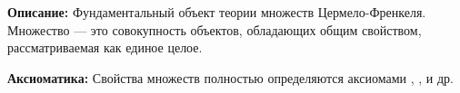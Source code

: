 

\hypertarget{def-set}{}
\begin{definition} %
\textbf{Описание:}
Фундаментальный объект теории множеств Цермело-Френкеля. Множество — это совокупность объектов, обладающих общим свойством, рассматриваемая как единое целое.

\textbf{Аксиоматика:}
Свойства множеств полностью определяются аксиомами , ,  и др.
\end{definition}